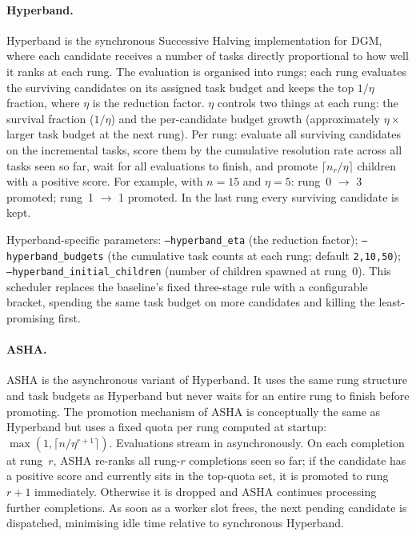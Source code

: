 \paragraph{Hyperband.}
Hyperband is the synchronous Successive Halving implementation for DGM,
where each candidate receives a number of tasks directly proportional to
how well it ranks at each rung. The evaluation is organised into rungs;
each rung evaluates the surviving candidates on its assigned task budget
and keeps the top $1/\eta$ fraction, where $\eta$ is the reduction
factor. $\eta$ controls two things at each rung: the survival fraction
($1/\eta$) and the per-candidate budget growth (approximately
$\eta\times$ larger task budget at the next rung). Per rung: evaluate all
surviving candidates on the incremental tasks, score them by the
cumulative resolution rate across all tasks seen so far, wait for all
evaluations to finish, and promote $\lceil n_r / \eta \rceil$ children
with a positive score. For example, with $n = 15$ and $\eta = 5$:
rung~0 $\rightarrow$ 3 promoted; rung~1 $\rightarrow$ 1 promoted. In the
last rung every surviving candidate is kept.

Hyperband-specific parameters: \texttt{--hyperband\_eta} (the reduction
factor); \texttt{--hyperband\_budgets} (the cumulative task counts at
each rung; default \texttt{2,10,50});
\texttt{--hyperband\_initial\_children} (number of children spawned at
rung~0). This scheduler replaces the baseline's fixed three-stage rule
with a configurable bracket, spending the same task budget on more
candidates and killing the least-promising first.

\paragraph{ASHA.}
ASHA is the asynchronous variant of Hyperband. It uses the same rung
structure and task budgets as Hyperband but never waits for an entire
rung to finish before promoting. The promotion mechanism of ASHA is
conceptually the same as Hyperband but uses a fixed quota per rung
computed at startup: $\max(1, \lceil n / \eta^{r+1} \rceil)$.
Evaluations stream in asynchronously. On each completion at
rung~$r$, ASHA re-ranks all rung-$r$ completions seen so far; if the
candidate has a positive score and currently sits in the top-quota set,
it is promoted to rung~$r+1$ immediately. Otherwise it is dropped and
ASHA continues processing further completions. As soon as a worker slot
frees, the next pending candidate is dispatched, minimising idle time
relative to synchronous Hyperband.

